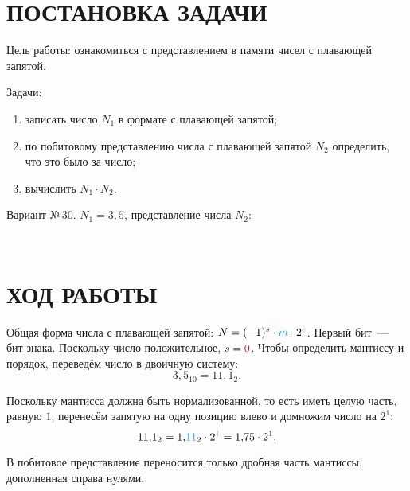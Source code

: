 \documentclass[14pt]{extarticle}
\newcommand\fp[3]{\begin{center}\vspace{-1.0em}\texttt{
        {\color{Maroon}{#1}}
        {\color{ForestGreen}{#2}}
        {\color{Cerulean}{#3}}
    }\end{center}\vspace{-0.5em}}
\begin{document}


\cfoot{\thepage}


\section{\MakeUppercase{Постановка задачи}}

Цель работы: ознакомиться с представлением в памяти чисел с плавающей запятой.

Задачи:

\begin{enumerate}[]

    \item записать число $N_1$ в формате с плавающей запятой;
    
    \item по побитовому представлению числа с плавающей запятой $N_2$ определить, что это было за число;
    
    \item вычислить $N_1 \cdot N_2$.

\end{enumerate}

Вариант №\,30. $N_1 = 3{,}5$, представление числа $N_2$:

\fp{0}{10000011}{11010010000000000000000}

\newpage

\section{\MakeUppercase{Ход работы}}


Общая форма числа с плавающей запятой:
$N = (-1)^{\color{Maroon} s} \cdot {\color{Cerulean} m}
\cdot 2^{\color{YellowGreen} e}$.
Первый бит~--- бит знака. Поскольку число положительное,
$s = {\color{Maroon} 0}$. Чтобы определить мантиссу и порядок, переведём число в двоичную систему:
$$3{,}5_{10} = 11{,}1_2.$$

Поскольку мантисса должна быть нормализованной, то есть иметь целую часть, равную $1$, перенесём запятую на одну позицию влево и домножим число на $2^1$:
$$11{,}1_2
= 1{,}{\color{Cerulean} 11}_2 \cdot 2^{\color{YellowGreen} 1}
= 1{,}75 \cdot 2^{1}.$$

В побитовое представление переносится только {\color{Cerulean}дробная часть мантиссы}, дополненная справа нулями.
\end{document}
